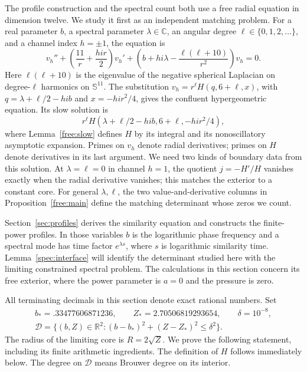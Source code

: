 \documentclass[11pt]{article}
\numberwithin{equation}{section}
\theoremstyle{definition}
\theoremstyle{remark}
\begin{document}
The profile construction and the spectral count both use a free radial
equation in dimension twelve. We study it first as an independent matching
problem. For a real parameter $b$, a spectral parameter $\lambda\in\mathbb C$,
an angular degree $\ell\in\{0,1,2,\ldots\}$, and a channel index $h=\pm1$,
the equation is
\begin{equation}\label{free:radial-equation}
 v_h''+\left(\frac{11}{r}+\frac{hi r}{2}\right)v_h'
 +\left(b+hi\lambda-\frac{\ell(\ell+10)}{r^2}\right)v_h=0.
\end{equation}
Here $\ell(\ell+10)$ is the eigenvalue of the negative spherical Laplacian
on degree-$\ell$ harmonics on $\mathbb S^{11}$. The substitution
$v_h=r^\ell H(q,6+\ell,x)$, with
$q=\lambda+\ell/2-hib$ and $x=-hi r^2/4$, gives the confluent
hypergeometric equation. Its slow solution is
\[
 r^\ell H(\lambda+\ell/2-hi b,6+\ell,-hi r^2/4),
\]
where Lemma~\ref{free:slow} defines $H$ by its integral and its
nonoscillatory asymptotic expansion. Primes on $v_h$ denote radial
derivatives; primes on $H$ denote derivatives in its last argument.
We need two kinds of boundary data
from this solution. At $\lambda=\ell=0$ in channel $h=1$, the quotient
$j=-H'/H$ vanishes exactly when the radial derivative vanishes; this
matches the exterior to a constant core. For general $\lambda,\ell$,
the two value-and-derivative columns in Proposition~\ref{free:main}
define the matching determinant whose zeros we count.

Section~\ref{sec:profiles} derives the similarity equation and constructs
the finite-power profiles. In those variables $b$ is the logarithmic phase
frequency and a spectral mode has time factor $e^{\lambda s}$, where
$s$ is logarithmic similarity time.
Lemma~\ref{spec:interface} will identify the determinant studied here
with the limiting constrained spectral problem. The calculations in this
section concern its free exterior, where the power parameter is $a=0$
and the pressure is zero.

All terminating decimals in this section denote exact rational numbers.  Set
\begin{equation}\label{free:disk}
 \begin{gathered}
 b_*=.33477606871236,\qquad Z_*=2.70506819293654,\qquad
 \delta=10^{-8},\\
 \mathcal D=\{(b,Z)\in\mathbb R^2:(b-b_*)^2+(Z-Z_*)^2\le\delta^2\}.
 \end{gathered}
\end{equation}
The radius of the limiting core is $R=2\sqrt Z$.
We prove the following statement, including its finite
arithmetic ingredients.  The definition of $H$ follows immediately below.
The degree on $\mathcal D$ means Brouwer degree on its interior.
\end{document}
